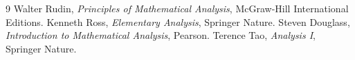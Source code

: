 \documentclass[11pt, a4paper, oneside]{book}
\begin{document}
\mainmatter












\backmatter


\begin{thebibliography}{9}
        Walter Rudin, \textit{Principles of Mathematical Analysis}, McGraw-Hill International Editions.
        Kenneth Ross, \textit{Elementary Analysis}, Springer Nature.
        Steven Douglass, \textit{Introduction to Mathematical Analysis}, Pearson.
        Terence Tao, \textit{Analysis I}, Springer Nature.
\end{thebibliography}
\end{document}

